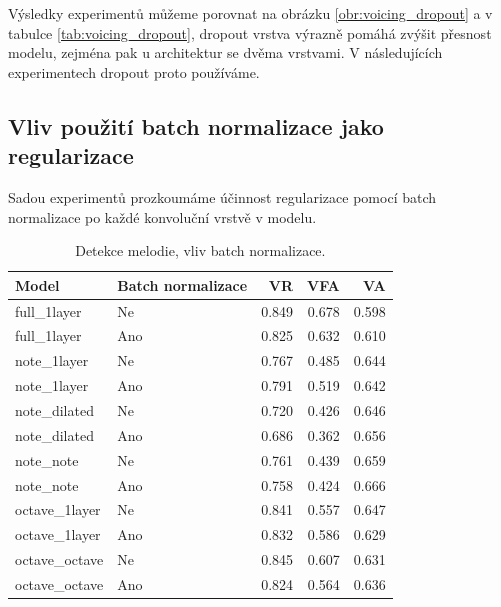 Výsledky experimentů můžeme porovnat na obrázku \ref{obr:voicing_dropout} a v tabulce \ref{tab:voicing_dropout}, dropout vrstva výrazně pomáhá zvýšit přesnost modelu, zejména pak u architektur se dvěma vrstvami. V následujících experimentech dropout proto používáme.

\subsection{Vliv použití batch normalizace jako regularizace}

Sadou experimentů prozkoumáme účinnost regularizace pomocí batch normalizace po každé konvoluční vrstvě v modelu. 

\begin{table}[h!]
\centering
    \begin{tabular}{llrrr}
    \toprule
            Model & Batch normalizace &    VR &   VFA &    VA \\
    \midrule
    full\_1layer &        Ne & 0.849 & 0.678 & 0.598 \\
    full\_1layer &        Ano & 0.825 & 0.632 & 0.610 \\
    note\_1layer &        Ne & 0.767 & 0.485 & 0.644 \\
    note\_1layer &        Ano & 0.791 & 0.519 & 0.642 \\
    note\_dilated &        Ne & 0.720 & 0.426 & 0.646 \\
    note\_dilated &        Ano & 0.686 & 0.362 & 0.656 \\
        note\_note &        Ne & 0.761 & 0.439 & 0.659 \\
        note\_note &        Ano & 0.758 & 0.424 & 0.666 \\
    octave\_1layer &        Ne & 0.841 & 0.557 & 0.647 \\
    octave\_1layer &        Ano & 0.832 & 0.586 & 0.629 \\
    octave\_octave &        Ne & 0.845 & 0.607 & 0.631 \\
    octave\_octave &        Ano & 0.824 & 0.564 & 0.636 \\
    \bottomrule
    \end{tabular}

\caption{Detekce melodie, vliv batch normalizace.}\label{tab:voicing_batchnorm}
\end{table}


